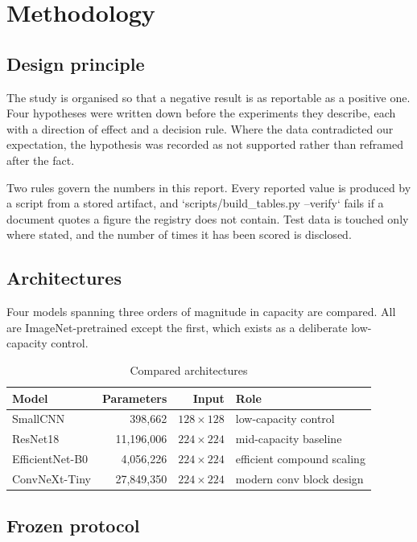 
\chapter{Methodology}
\label{ch:methodology}

\section{Design principle}

The study is organised so that a negative result is as reportable as a positive one.
Four hypotheses were written down before the experiments they describe, each with a
direction of effect and a decision rule. Where the data contradicted our expectation,
the hypothesis was recorded as not supported rather than reframed after the fact.

Two rules govern the numbers in this report. Every reported value is produced by a
script from a stored artifact, and `scripts/build\_tables.py --verify` fails if a
document quotes a figure the registry does not contain. Test data is touched only
where stated, and the number of times it has been scored is disclosed.

\section{Architectures}

Four models spanning three orders of magnitude in capacity are compared. All are
ImageNet-pretrained except the first, which exists as a deliberate low-capacity
control.

\begin{table}[H]
\centering
\caption{Compared architectures}
\label{tab:arch}
\tabfont
\begin{tabularx}{\textwidth}{@{}lrrY@{}}
\toprule
\textbf{Model} & \textbf{Parameters} & \textbf{Input} & \textbf{Role} \\
\midrule
SmallCNN & 398,662 & $128\times128$ & low-capacity control \\
ResNet18 & 11,196,006 & $224\times224$ & mid-capacity baseline \\
EfficientNet-B0 & 4,056,226 & $224\times224$ & efficient compound scaling \\
ConvNeXt-Tiny & 27,849,350 & $224\times224$ & modern conv block design \\
\bottomrule
\end{tabularx}
\end{table}

\section{Frozen protocol}

